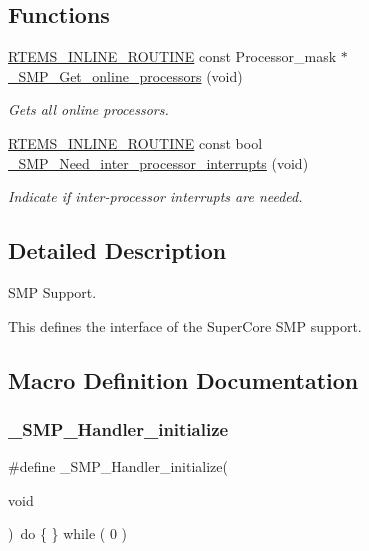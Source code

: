 \subsection*{Functions}
\begin{DoxyCompactItemize}
\item 
\mbox{\hyperlink{group__RTEMSScoreBaseDefs_gac216239df231d5dbd15e3520b0b9313f}{R\+T\+E\+M\+S\+\_\+\+I\+N\+L\+I\+N\+E\+\_\+\+R\+O\+U\+T\+I\+NE}} const Processor\+\_\+mask $\ast$ \mbox{\hyperlink{group__RTEMSScoreSMP_ga4646a775301c0cebd6c865245bae60a2}{\+\_\+\+S\+M\+P\+\_\+\+Get\+\_\+online\+\_\+processors}} (void)
\begin{DoxyCompactList}\small\item\em Gets all online processors. \end{DoxyCompactList}\item 
\mbox{\hyperlink{group__RTEMSScoreBaseDefs_gac216239df231d5dbd15e3520b0b9313f}{R\+T\+E\+M\+S\+\_\+\+I\+N\+L\+I\+N\+E\+\_\+\+R\+O\+U\+T\+I\+NE}} const bool \mbox{\hyperlink{group__RTEMSScoreSMP_ga7a29d1349621da5955a51cbfcc6450f1}{\+\_\+\+S\+M\+P\+\_\+\+Need\+\_\+inter\+\_\+processor\+\_\+interrupts}} (void)
\begin{DoxyCompactList}\small\item\em Indicate if inter-\/processor interrupts are needed. \end{DoxyCompactList}\end{DoxyCompactItemize}


\subsection{Detailed Description}
S\+MP Support. 

This defines the interface of the Super\+Core S\+MP support. 

\subsection{Macro Definition Documentation}
\mbox{\label{group__RTEMSScoreSMP_ga4a125e6d06b0908b094ff7d67bea5f8e}} 
\subsubsection{\texorpdfstring{\_SMP\_Handler\_initialize}{\_SMP\_Handler\_initialize}}
{\footnotesize\ttfamily \#define \+\_\+\+S\+M\+P\+\_\+\+Handler\+\_\+initialize(\begin{DoxyParamCaption}\item[{}]{void }\end{DoxyParamCaption})~do \{ \} while ( 0 )}



